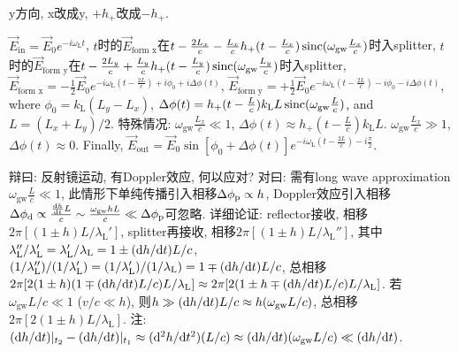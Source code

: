 y方向, x改成y, $+h_+$改成$-h_+$.

$\vec{E}_\text{in}=\vec{E}_0e^{-i\omega_\text{L}t}$, $t$时的$\vec{E}_\text{form x}$在$t-\frac{2L_x}{c}-\frac{L_x}{c}h_+(t-\frac{L_x}{c})\operatorname{sinc}(\omega_\text{gw}\frac{L_x}{c})$时入splitter, $t$时的$\vec{E}_\text{form y}$在$t-\frac{2L_y}{c}+\frac{L_y}{c}h_+(t-\frac{L_y}{c})\operatorname{sinc}(\omega_\text{gw}\frac{L_y}{c})$时入splitter, $\vec{E}_\text{form x}=-\frac{1}{2}\vec{E}_0e^{-i\omega_\text{L}(t-\frac{2L}{c})+i\phi_0+i\Delta\phi(t)}$, $\vec{E}_\text{form y}=+\frac{1}{2}\vec{E}_0e^{-i\omega_\text{L}(t-\frac{2L}{c})-i\phi_0-i\Delta\phi(t)}$, where $\phi_0=k_\text{L}(L_y-L_x)$, $\Delta\phi(t)=h_+(t-\frac{L}{c})k_\text{L}L\operatorname{sinc}(\omega_\text{gw}\frac{L}{c})$, and $L=(L_x+L_y)/2$. 特殊情况: $\omega_\text{gw}\frac{L_x}{c}\ll1$, $\Delta\phi(t)\approx h_+(t-\frac{L}{c})k_\text{L}L$. $\omega_\text{gw}\frac{L_x}{c}\gg1$, $\Delta\phi(t)\approx0$. Finally, $\vec{E}_\text{out}=\vec{E}_0\sin[\phi_0+\Delta\phi(t)]e^{-i\omega_\text{L}(t-\frac{2L}{c})-i\frac{\pi}{2}}$.

辩曰: 反射镜运动, 有Doppler效应, 何以应对? 对曰: 需有long wave approximation $\omega_\text{gw}\frac{L}{c}\ll1$, 此情形下单纯传播引入相移$\Delta\phi_\text{p}\propto h$, Doppler效应引入相移$\Delta\phi_\text{d}\propto \frac{\frac{\mathrm{d} h}{\mathrm{d} t}L}{c}\sim\frac{\omega_\text{gw}hL}{c}\ll\Delta\phi_\text{p}$可忽略. 详细论证: reflector接收, 相移$2\pi[(1\pm h)L/\lambda_\text{L}']$, splitter再接收, 相移$2\pi[(1\pm h)L/\lambda_\text{L}'']$, 其中$\lambda_\text{L}''/\lambda_\text{L}'=\lambda_\text{L}'/\lambda_\text{L}=1\pm(\mathrm{d} h/\mathrm{d} t)L/c$, $(1/\lambda_\text{L}'')/(1/\lambda_\text{L}')=(1/\lambda_\text{L}')/(1/\lambda_\text{L})=1\mp(\mathrm{d} h/\mathrm{d} t)L/c$, 总相移$2\pi[2(1\pm h)(1\mp(\mathrm{d} h/\mathrm{d} t)L/c)L/\lambda_\text{L}]\approx2\pi[2(1\pm h\mp(\mathrm{d} h/\mathrm{d} t)L/c)L/\lambda_\text{L}]$. 若$\omega_\text{gw}L/c\ll1$ ($v/c\ll h$), 则$h\gg(\mathrm{d} h/\mathrm{d} t)L/c\approx h(\omega_\text{gw}L/c)$, 总相移$2\pi[2(1\pm h)L/\lambda_\text{L}]$. 注: $(\mathrm{d} h/\mathrm{d} t)|_{t_2}-(\mathrm{d} h/\mathrm{d} t)|_{t_1}\approx(\mathrm{d}^2 h/\mathrm{d} t^2)(L/c)\approx(\mathrm{d} h/\mathrm{d} t)(\omega_\text{gw}L/c)\ll(\mathrm{d} h/\mathrm{d} t)$.
